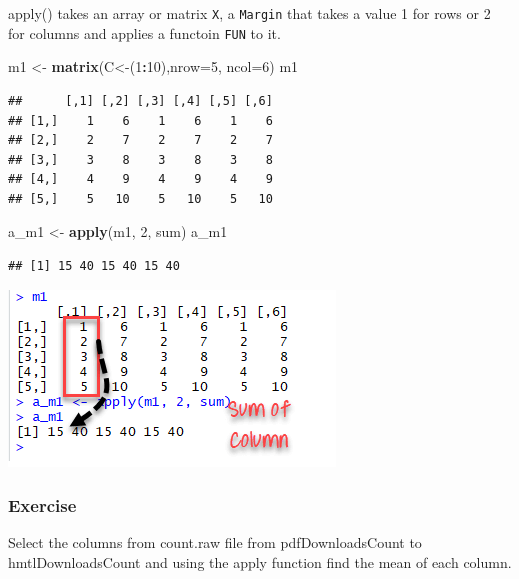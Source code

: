 \documentclass[
]{book}
\newenvironment{Shaded}{\begin{snugshade}}{\end{snugshade}}
\newcommand{\DataTypeTok}[1]{\textcolor[rgb]{0.13,0.29,0.53}{#1}}
\newcommand{\DecValTok}[1]{\textcolor[rgb]{0.00,0.00,0.81}{#1}}
\newcommand{\KeywordTok}[1]{\textcolor[rgb]{0.13,0.29,0.53}{\textbf{#1}}}
\newcommand{\NormalTok}[1]{#1}
\newcommand{\OperatorTok}[1]{\textcolor[rgb]{0.81,0.36,0.00}{\textbf{#1}}}
\newcommand{\StringTok}[1]{\textcolor[rgb]{0.31,0.60,0.02}{#1}}
\begin{document}
apply() takes an array or matrix \texttt{X}, a \texttt{Margin} that takes a value 1 for rows or 2 for columns and applies a functoin \texttt{FUN} to it.

\begin{Shaded}
\begin{Highlighting}[]
\NormalTok{m1 <-}\StringTok{ }\KeywordTok{matrix}\NormalTok{(C<-(}\DecValTok{1}\OperatorTok{:}\DecValTok{10}\NormalTok{),}\DataTypeTok{nrow=}\DecValTok{5}\NormalTok{, }\DataTypeTok{ncol=}\DecValTok{6}\NormalTok{)}
\NormalTok{m1}
\end{Highlighting}
\end{Shaded}

\begin{verbatim}
##      [,1] [,2] [,3] [,4] [,5] [,6]
## [1,]    1    6    1    6    1    6
## [2,]    2    7    2    7    2    7
## [3,]    3    8    3    8    3    8
## [4,]    4    9    4    9    4    9
## [5,]    5   10    5   10    5   10
\end{verbatim}

\begin{Shaded}
\begin{Highlighting}[]
\NormalTok{a_m1 <-}\StringTok{ }\KeywordTok{apply}\NormalTok{(m1, }\DecValTok{2}\NormalTok{, sum)}
\NormalTok{a_m1}
\end{Highlighting}
\end{Shaded}

\begin{verbatim}
## [1] 15 40 15 40 15 40
\end{verbatim}

\includegraphics{img/apply.png}

\hypertarget{exercise-1}{%
\subsubsection*{Exercise}\label{exercise-1}}

Select the columns from count.raw file from pdfDownloadsCount to hmtlDownloadsCount and using the apply function find the mean of each column.
\end{document}
